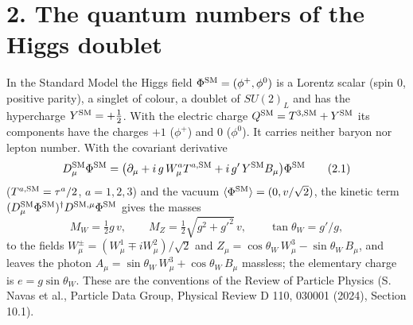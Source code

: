 \documentclass[
  10pt,
]{article}
\begin{document}
\hypertarget{the-quantum-numbers-of-the-higgs-doublet}{%
\section{2. The quantum numbers of the Higgs
doublet}\label{the-quantum-numbers-of-the-higgs-doublet}}

In the Standard Model the Higgs field \(\Phi^{\rm SM}=(\phi^+,\phi^0)\)
is a Lorentz scalar (spin 0, positive parity), a singlet of colour, a
doublet of \(SU(2)_L\) and has the hypercharge \(Y^{\rm SM}=+\tfrac12\).
With the electric charge \(Q^{\rm SM}=T^{3,{\rm SM}}+Y^{\rm SM}\) its
components have the charges \(+1\) (\(\phi^+\)) and \(0\) (\(\phi^0\)).
It carries neither baryon nor lepton number. With the covariant
derivative
\[D^{\rm SM}_\mu\Phi^{\rm SM}=\big(\partial_\mu+i\,g\,W^a_\mu T^{a,{\rm SM}}+i\,g'\,Y^{\rm SM}B_\mu\big)\Phi^{\rm SM}\tag{2.1}\]
(\(T^{a,{\rm SM}}=\tau^a/2\), \(a=1,2,3\)) and the vacuum
\(\langle\Phi^{\rm SM}\rangle=(0,v/\sqrt2)\), the kinetic term
\((D^{\rm SM}_\mu\Phi^{\rm SM})^\dagger D^{{\rm SM},\mu}\Phi^{\rm SM}\)
gives the masses
\[M_W=\tfrac12g\,v,\qquad M_Z=\tfrac12\sqrt{g^2+g'^2}\,v,\qquad\tan\theta_W=g'/g,\tag{2.2}\]
to the fields \(W^\pm_\mu=(W^1_\mu\mp iW^2_\mu)/\sqrt2\) and
\(Z_\mu=\cos\theta_W\,W^3_\mu-\sin\theta_W\,B_\mu\), and leaves the
photon \(A_\mu=\sin\theta_W\,W^3_\mu+\cos\theta_W\,B_\mu\) massless; the
elementary charge is \(e=g\sin\theta_W\). These are the conventions of
the Review of Particle Physics (S. Navas et al., Particle Data Group,
Physical Review D 110, 030001 (2024), Section 10.1).
\end{document}
